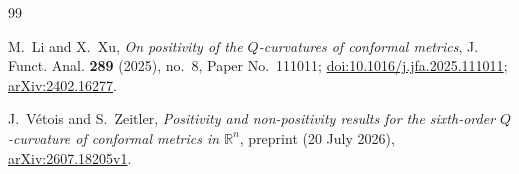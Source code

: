 \documentclass[11pt,reqno]{amsart}
\theoremstyle{remark}
\begin{document}
\begin{thebibliography}{99}

M.~Li and X.~Xu,
\emph{On positivity of the $Q$-curvatures of conformal metrics},
J. Funct. Anal. \textbf{289} (2025), no.~8, Paper No.~111011;
\href{https://doi.org/10.1016/j.jfa.2025.111011}
{doi:10.1016/j.jfa.2025.111011};
\href{https://arxiv.org/abs/2402.16277}{arXiv:2402.16277}.

J.~V\'etois and S.~Zeitler,
\emph{Positivity and non-positivity results for the sixth-order
$Q$-curvature of conformal metrics in $\mathbb{R}^n$},
preprint (20 July 2026),
\href{https://arxiv.org/abs/2607.18205}{arXiv:2607.18205v1}.

\end{thebibliography}
\end{document}
